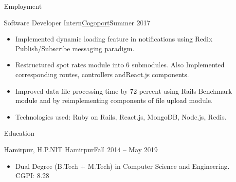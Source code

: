 \documentclass[]{mcdowellcv}
\begin{document}
	\makeheader
	
	\begin{cvsection}{Employment}
		\begin{cvsubsection}{Software Developer Intern}{\href {http://www.cogoport.com/}{Cogoport}}{Summer 2017}			
			\begin{itemize}
				\item Implemented dynamic loading feature in notifications using Redix Publish/Subscribe messaging paradigm.
				\item Restructured spot rates module into 6 submodules. Also Implemented corresponding routes, controllers and\newline React.js components.
				\item Improved data file processing time by 72 percent using Rails Benchmark module and by reimplementing components of file upload module.
				\item Technologies used: Ruby on Rails, React.js, MongoDB, Node.js, Redis.
			\end{itemize}
		\end{cvsubsection}
	\end{cvsection}
	
	\begin{cvsection}{Education}
		\begin{cvsubsection}{Hamirpur, H.P.}{NIT Hamirpur}{Fall 2014 -- May 2019}
			\begin{itemize}
				\item Dual Degree (B.Tech + M.Tech) in Computer Science and Engineering. CGPI: 8.28
			\end{itemize}
		\end{cvsubsection}
	\end{cvsection}
	
\end{document}
